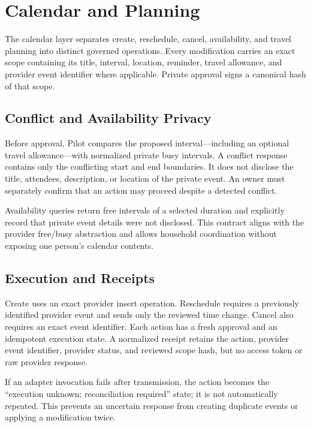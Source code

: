 \section{Calendar and Planning}
\label{sec:pilot-calendar-planning}

The calendar layer separates create, reschedule, cancel, availability, and travel
planning into distinct governed operations.  Every modification carries an exact
scope containing its title, interval, location, reminder, travel allowance, and
provider event identifier where applicable.  Private approval signs a canonical
hash of that scope.

\subsection{Conflict and Availability Privacy}

Before approval, Pilot compares the proposed interval---including an optional
travel allowance---with normalized private busy intervals.  A conflict response
contains only the conflicting start and end boundaries.  It does not disclose
the title, attendees, description, or location of the private event.  An owner
must separately confirm that an action may proceed despite a detected conflict.

Availability queries return free intervals of a selected duration and explicitly
record that private event details were not disclosed.  This contract aligns with
the provider free/busy abstraction and allows household coordination without
exposing one person's calendar contents.

\subsection{Execution and Receipts}

Create uses an exact provider insert operation.  Reschedule requires a previously
identified provider event and sends only the reviewed time change.  Cancel also
requires an exact event identifier.  Each action has a fresh approval and an
idempotent execution state.  A normalized receipt retains the action, provider
event identifier, provider status, and reviewed scope hash, but no access token or
raw provider response.

If an adapter invocation fails after transmission, the action becomes
the ``execution unknown; reconciliation required'' state; it is not automatically
repeated.
This prevents an uncertain response from creating duplicate events or applying a
modification twice.


